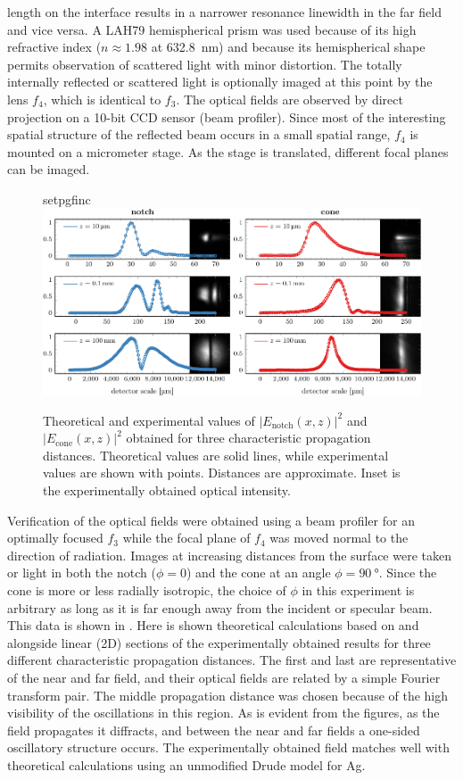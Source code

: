 length on the interface results in a narrower resonance linewidth in the
far field and vice versa.  A LAH79 hemispherical prism was used because of
its high refractive index ($n\approx 1.98$ at \SI{632.8}{\nano\meter}) and
because its hemispherical shape permits observation of scattered light with
minor distortion.  The totally internally reflected or scattered light is
optionally imaged at this point by the lens $f_4$, which is identical to
$f_3$.  The optical fields are observed by direct projection on a 10-bit
CCD sensor (beam profiler).  Since most of the interesting spatial structure of the
reflected beam occurs in a small spatial range, $f_4$
is mounted on a micrometer stage.  As the stage is translated, different focal
planes can be imaged.

\begin{figure}[ht]
 \centering
 {setpgfinc}
	\includegraphics{interference/figures/fig2-crop.pdf}
	\caption{ Theoretical and experimental values of
$|E_\text{notch}(x,z)|^2$ and $|E_\text{cone}(x,z)|^2$ obtained for three
characteristic propagation distances.  Theoretical values are solid lines,
while experimental values are shown with points.  Distances are
approximate.  Inset is the experimentally obtained optical intensity.}
 \label{fig:fresnelprop}
\end{figure}
Verification of the optical fields were obtained using a beam profiler for
an optimally focused $f_3$ while the focal plane of $f_4$ was moved normal
to the direction of radiation.  Images at increasing distances from the
surface were taken or light in both the notch
($\phi=0$) and the cone at an angle $\phi = \SI{90}{\degree}$.  Since the
cone is more or less radially isotropic, the choice of $\phi$ in this
experiment is arbitrary as long as it is far enough away from the incident
or specular beam.  This data is shown in .  Here is
shown theoretical calculations based on  and
 alongside linear (2D) sections of the experimentally obtained results for
three different characteristic propagation distances.  The first and last
are representative of the near and far field, and their optical fields are
related by a simple Fourier transform pair.  The middle propagation
distance was chosen because of the high visibility of the oscillations in
this region.  As is evident from the figures, as the field propagates it
diffracts, and between the near and far fields a one-sided oscillatory
structure occurs.  The experimentally obtained field matches well with
theoretical calculations using an unmodified Drude model for Ag.

